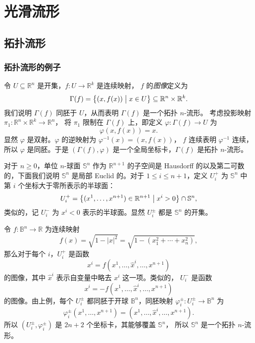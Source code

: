 \documentclass[fontset=none]{Notes}
\newcommand{\abs}[1]{\left|#1\right|}
\begin{document}
\frontmatter

\tableofcontents

\mainmatter

\chapter{光滑流形}

\section{拓扑流形}

\subsection{拓扑流形的例子}

\begin{example}[连续函数的图像]\label{exa:graph of continuous fuction}
  令 $U\subseteq\mathbb{R}^n$ 是开集，$f:U\to\mathbb{R}^k$ 是连续映射，
  $f$ 的\emph{图像}定义为
  \[
    \Gamma(f)=\bigl\{(x,f(x))\bigm| x\in U\bigr\} \subseteq\mathbb{R}^n\times\mathbb{R}^k. 
  \]
  我们说明 $\Gamma(f)$ 同胚于 $U$，从而表明 $\Gamma(f)$ 是一个拓扑 $n$-流形。
  考虑投影映射 $\pi_1:\mathbb{R}^n\times\mathbb{R}^k\to\mathbb{R}^n$，
  将 $\pi_1$ 限制在 $\Gamma(f)$ 上，即定义 $\varphi:\Gamma(f)\to U$ 为
  \[
    \varphi(x,f(x))=x.  
  \]
  显然 $\varphi$ 是双射。$\varphi$ 的逆映射为 $\varphi^{-1}(x)=(x,f(x))$，
  $f$ 连续表明 $\varphi^{-1}$ 连续，所以 $\varphi$ 是同胚。于是
  $(\Gamma(f),\varphi)$ 是一个全局坐标卡，$\Gamma(f)$ 是拓扑 $n$-流形。
\end{example}

\begin{example}[球面]\label{exa:topological sphere}
  对于 $n\geq 0$，单位 $n$-球面 $\mathbb{S}^n$ 作为 $\mathbb{R}^{n+1}$
  的子空间是 Hausdorff 的以及第二可数的，下面我们说明 $\mathbb{S}^n$
  是局部 Euclid 的。对于 $1\leq i\le n+1$，定义 $U_i^+$ 为 $\mathbb{S}^n$
  中第 $i$ 个坐标大于零所表示的半球面：
  \[
    U_i^+=\bigl\{ (x^1,\dots,x^{n+1})\in \mathbb{R}^{n+1}\bigm| x^i>0 \bigr\} 
    \cap\mathbb{S}^n ,
  \]
  类似的，记 $U_i^-$ 为 $x^i<0$ 表示的半球面。显然 $U_i^\pm$ 都是
  $\mathbb{S}^n$ 的开集。

  令 $f:\mathbb{B}^n\to\mathbb{R}$ 为连续映射
  \[
    f(x)=\sqrt{1-\abs{x}^2}=\sqrt{1-(x_1^2+\cdots+x_n^2)},
  \]
  那么对于每个 $i$，$U_i^+$ 是函数
  \[
    x^i=f(x^1,\dots,\hat x^i,\dots,x^{n+1})  
  \]
  的图像，其中 $\hat{x}^i$ 表示自变量中略去 $x^i$ 这一项。类似的，
  $U_i^-$ 是函数
  \[
    x^i=-f(x^1,\dots,\hat x^i,\dots,x^{n+1})  
  \]
  的图像。由上例，每个 $U_i^\pm$ 都同胚于开球 $\mathbb{B}^n$，同胚映射
  $\varphi_i^\pm:U_i^\pm\to\mathbb{B}^n$ 为
  \[
    \varphi_i^\pm(x^1,\dots,x^{n+1})=(x^1,\dots,\hat x^i,\dots,x^{n+1}).  
  \]
  所以 $(U_i^\pm,\varphi_i^\pm)$ 是 $2n+2$ 个坐标卡，其能够覆盖 $\mathbb{S}^n$，
  所以 $\mathbb{S}^n$ 是一个拓扑 $n$-流形。
\end{example}
\end{document}
